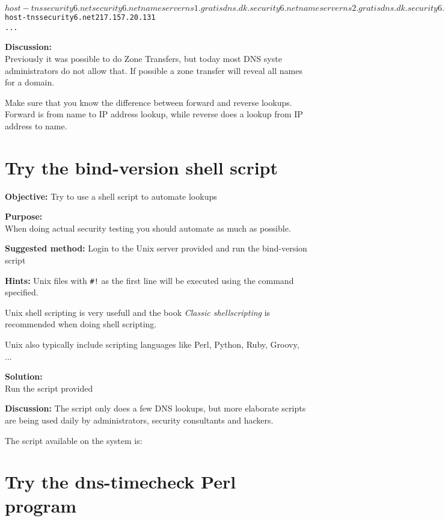 \documentclass[a4paper,11pt,notitlepage]{report}
\begin{document}
\begin{alltt}
$ host -t ns security6.net
security6.net name server ns1.gratisdns.dk.
security6.net name server ns2.gratisdns.dk.
security6.net name server ns3.gratisdns.dk.
security6.net name server ns4.gratisdns.dk.
security6.net name server ns5.gratisdns.dk.
$ host -t ns security6.net 217.157.20.131
...
\end{alltt}


{\bf Discussion:}\\
Previously it was possible to do Zone Transfers, but today most DNS syste administrators do not allow that. If possible a zone transfer will reveal all names for a domain.

Make sure that you know the difference between forward and reverse lookups. Forward is from name to IP address lookup, while reverse does a lookup from IP address to name.


\chapter{Try the bind-version shell script}
\label{ex:bind-version-script}

{\bf Objective:}
Try to use a shell script to automate lookups

{\bf Purpose:}\\
When doing actual security testing you should automate as much as possible.

{\bf Suggested method:}
Login to the Unix server provided and run the bind-version script

{\bf Hints:}
Unix files with \verb+#!+ as the first line will be executed using the command specified.

Unix shell scripting is very usefull and the book
\emph{Classic shellscripting} is recommended when doing shell scripting.

Unix also typically include scripting languages like Perl, Python, Ruby, Groovy, ...

{\bf Solution:}\\
Run the script provided

{\bf Discussion:}
The script only does a few DNS lookups, but more elaborate scripts are being used daily by administrators, security consultants and hackers.

The script available on the system is:
{\small
{}
}


\chapter{Try the dns-timecheck Perl program}
\label{ex:dns-timecheck}
\end{document}
